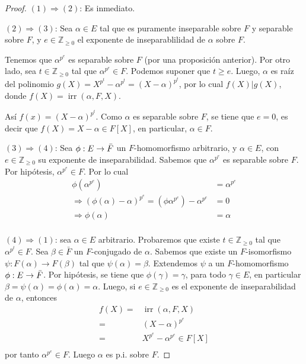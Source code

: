 \documentclass[12pt]{report}
\theoremstyle{largebreak}
\DeclareMathOperator{\irr}{irr}
\begin{document}
    \begin{proof}
        $(1)\Rightarrow(2)$: Es inmediato.

        $(2)\Rightarrow(3)$: Sea $\alpha\in E$ tal que es puramente inseparable sobre $F$ y separable sobre $F$, y $e\in\mathbb{Z}_{\geq0}$ el exponente de inseparablilidad de $\alpha$ sobre $F$.

        Tenemos que $\alpha^{p^e}$ es separable sobre $F$ (por una proposición anterior). Por otro lado, sea $t\in\mathbb{Z}_{\geq0}$ tal que $\alpha^{p^e}\in F$. Podemos suponer que $t\geq e$. Luego, $\alpha$ es raíz del polinomio $g(X)=X^{p^t}-\alpha^{p^t}=(X-\alpha)^{p^t}$, por lo cual $f(X)|g(X)$, donde $f(X)=\irr(\alpha,F,X)$.

        Así $f(x)=(X-\alpha)^{p^t}$. Como $\alpha$ es separable sobre $F$, se tiene que $e=0$, es decir que $f(X)=X-\alpha\in F[X]$, en particular, $\alpha\in F$.

        $(3)\Rightarrow(4)$: Sea $\phi:E\rightarrow\Bar{F}$ un $F$-homomorfismo arbitrario, y $\alpha\in E$, con $e\in\mathbb{Z}_{\geq0}$ su exponente de inseparabilidad. Sabemos que $\alpha^{p^e}$ es separable sobre $F$. Por hipótesis, $\alpha^{p^e}\in F$. Por lo cual
        \begin{equation*}
            \begin{split}
                \phi(\alpha^{p^e})&=\alpha^{p^e}\\
                \Rightarrow (\phi(\alpha)-\alpha)^{p^e}=\left(\phi\alpha^{p^e}\right)-\alpha^{p^e}&=0\\
                \Rightarrow \phi(\alpha)&=\alpha\\
            \end{split}
        \end{equation*} 

        $(4)\Rightarrow(1)$: sea $\alpha\in E$ arbitrario. Probaremos que existe $t\in\mathbb{Z}_{\geq0}$ tal que $\alpha^{p^t}\in F$. Sea $\beta\in\bar{F}$ un $F$-conjugado de $\alpha$. Sabemos que existe un $F$-isomorfismo $\psi:F(\alpha)\rightarrow F(\beta)$ tal que $\psi(\alpha)=\beta$. Extendemos $\psi$ a un $F$-homomorfismo $\phi:E\rightarrow \Bar{F}$. Por hipótesis, se tiene que $\phi(\gamma)=\gamma$, para todo $\gamma\in E$, en particular $\beta = \psi(\alpha)=\phi(\alpha)=\alpha$. Luego, si $e\in\mathbb{Z}_{\geq0}$ es el exponente de inseparabilidad de $\alpha$, entonces
        \begin{equation*}
            \begin{split}
                f(X)=&\irr(\alpha,F,X)\\
                =&(X-\alpha)^{p^e}\\
                =&X^{p^e}-\alpha^{p^e}\in F[X]\\
            \end{split}
        \end{equation*}
        por tanto $\alpha^{p^e}\in F$. Luego $\alpha$ es p.i. sobre $F$.
    \end{proof}
\end{document}
